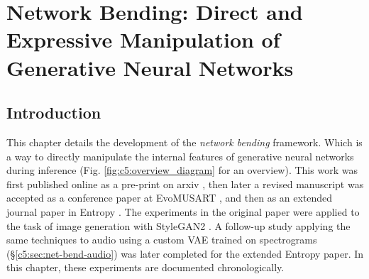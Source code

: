 \chapter{Network Bending: Direct and Expressive Manipulation of Generative Neural Networks}
\label{ch:net_bend}

\section{Introduction}

This chapter details the development of the \textit{network bending} framework. Which is a way to directly manipulate the internal features of generative neural networks during inference (Fig. \ref{fig:c5:overview_diagram} for an overview). This work was first published online as a pre-print on arxiv \citep{broad2020network}, then later a revised manuscript was accepted as a conference paper at EvoMUSART \citep{broad2021network}, and then as an extended journal paper in Entropy \citep{broad2022network}.
The experiments in the original paper were applied to the task of image generation with StyleGAN2 \citep{karras2019analyzing}. 
A follow-up study applying the same techniques to audio using a custom VAE trained on spectrograms (\S \ref{c5:sec:net-bend-audio}) was later completed for the extended Entropy paper. 
In this chapter, these experiments are documented chronologically.


